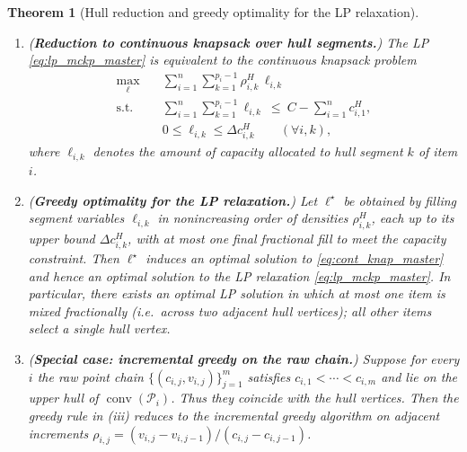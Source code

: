 \documentclass[11pt, a4paper]{article}
\theoremstyle{plain}
\newtheorem{theorem}{Theorem}
\theoremstyle{definition}
\theoremstyle{remark}
\begin{document}
\begin{theorem}[Hull reduction and greedy optimality for the LP relaxation]
\begin{enumerate}
\item[(ii)] (\textbf{Reduction to continuous knapsack over hull segments.})
The LP \eqref{eq:lp_mckp_master} is equivalent to the continuous knapsack problem
\begin{align}\label{eq:cont_knap_master}
\max_{\bm{\ell}} \quad & \sum_{i=1}^n\sum_{k=1}^{p_i-1}\rho^H_{i,k}\,\ell_{i,k}\\
\text{s.t.}\quad & \sum_{i=1}^n\sum_{k=1}^{p_i-1}\ell_{i,k}\ \le\ C-\sum_{i=1}^n c^H_{i,1},\nonumber\\
& 0\le \ell_{i,k}\le \Delta c^H_{i,k}\qquad(\forall i,k),\nonumber
\end{align}
where $\ell_{i,k}$ denotes the amount of capacity allocated to hull segment $k$ of item $i$.

\item[(iii)] (\textbf{Greedy optimality for the LP relaxation.})
Let $\bm{\ell}^\star$ be obtained by filling segment variables $\ell_{i,k}$ in nonincreasing order of densities $\rho^H_{i,k}$,
each up to its upper bound $\Delta c^H_{i,k}$, with at most one final fractional fill to meet the capacity constraint.
Then $\bm{\ell}^\star$ induces an optimal solution to \eqref{eq:cont_knap_master} and hence an optimal solution to the LP relaxation
\eqref{eq:lp_mckp_master}. In particular, there exists an optimal LP solution in which at most one item is mixed fractionally
(i.e.\ across two adjacent hull vertices); all other items select a single hull vertex.

\item[(iv)] (\textbf{Special case: incremental greedy on the raw chain.})
Suppose for every $i$ the raw point chain $\{(c_{i,j},v_{i,j})\}_{j=1}^m$ satisfies
$c_{i,1}<\cdots<c_{i,m}$ and lie on the upper hull of $\operatorname{conv}(\mathcal P_i)$.
Thus they coincide with the hull vertices.
Then the greedy rule in (iii) reduces to the \emph{incremental greedy algorithm} on adjacent increments
$\rho_{i,j}=(v_{i,j}-v_{i,j-1})/(c_{i,j}-c_{i,j-1})$.
\end{enumerate}
\end{theorem}
\end{document}
